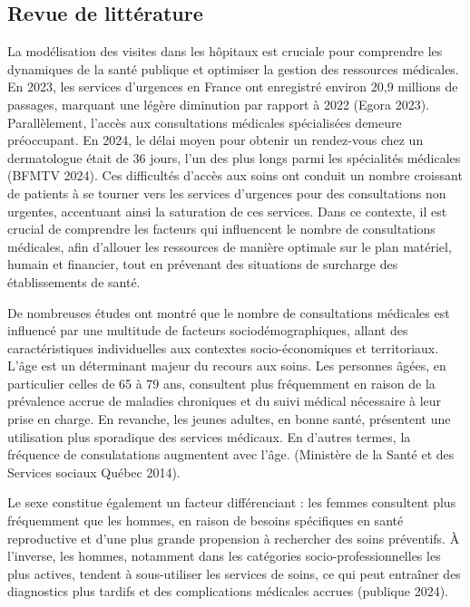 \documentclass[
]{article}
\begin{document}
\subsection{Revue de littérature}\label{revue-de-littuxe9rature}

La modélisation des visites dans les hôpitaux est cruciale pour
comprendre les dynamiques de la santé publique et optimiser la gestion
des ressources médicales. En 2023, les services d'urgences en France ont
enregistré environ 20,9 millions de passages, marquant une légère
diminution par rapport à 2022 (Egora 2023). Parallèlement, l'accès aux
consultations médicales spécialisées demeure préoccupant. En 2024, le
délai moyen pour obtenir un rendez-vous chez un dermatologue était de 36
jours, l'un des plus longs parmi les spécialités médicales (BFMTV 2024).
Ces difficultés d'accès aux soins ont conduit un nombre croissant de
patients à se tourner vers les services d'urgences pour des
consultations non urgentes, accentuant ainsi la saturation de ces
services. Dans ce contexte, il est crucial de comprendre les facteurs
qui influencent le nombre de consultations médicales, afin d'allouer les
ressources de manière optimale sur le plan matériel, humain et
financier, tout en prévenant des situations de surcharge des
établissements de santé.

De nombreuses études ont montré que le nombre de consultations médicales
est influencé par une multitude de facteurs sociodémographiques, allant
des caractéristiques individuelles aux contextes socio-économiques et
territoriaux. L'âge est un déterminant majeur du recours aux soins. Les
personnes âgées, en particulier celles de 65 à 79 ans, consultent plus
fréquemment en raison de la prévalence accrue de maladies chroniques et
du suivi médical nécessaire à leur prise en charge. En revanche, les
jeunes adultes, en bonne santé, présentent une utilisation plus
sporadique des services médicaux. En d'autres termes, la fréquence de
consulatations augmentent avec l'âge. (Ministère de la Santé et des
Services sociaux Québec 2014).

Le sexe constitue également un facteur différenciant : les femmes
consultent plus fréquemment que les hommes, en raison de besoins
spécifiques en santé reproductive et d'une plus grande propension à
rechercher des soins préventifs. À l'inverse, les hommes, notamment dans
les catégories socio-professionnelles les plus actives, tendent à
sous-utiliser les services de soins, ce qui peut entraîner des
diagnostics plus tardifs et des complications médicales accrues
(publique 2024).
\end{document}
